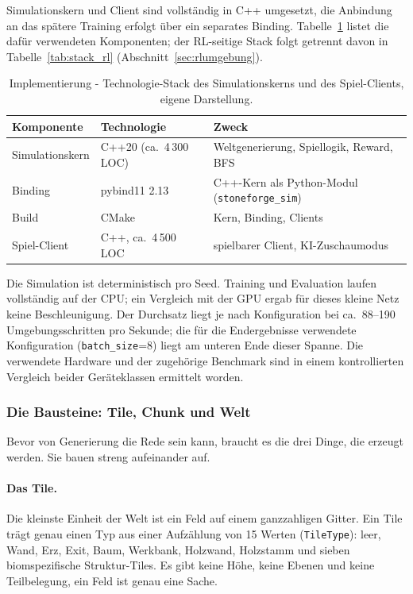 \documentclass[11pt,a4paper]{article}
\begin{document}
Simulationskern und Client sind vollständig in C++ umgesetzt, die Anbindung
an das spätere Training erfolgt über ein separates Binding.
Tabelle~\ref{tab:stack} listet die dafür verwendeten Komponenten; der
RL-seitige Stack folgt getrennt davon in Tabelle~\ref{tab:stack_rl}
(Abschnitt~\ref{sec:rlumgebung}).

\begin{table}[h]
\centering
\footnotesize
\begin{tabular}{@{}lll@{}}
\toprule
\textbf{Komponente} & \textbf{Technologie} & \textbf{Zweck} \\
\midrule
Simulationskern & C++20 (ca.\ 4\,300 LOC) & Weltgenerierung, Spiellogik, Reward, BFS \\
Binding & pybind11 2.13 & C++-Kern als Python-Modul (\texttt{stoneforge\_sim}) \\
Build & CMake & Kern, Binding, Clients \\
Spiel-Client & C++, ca.\ 4\,500 LOC & spielbarer Client, KI-Zuschaumodus \\
\bottomrule
\end{tabular}
\caption[Technologie-Stack: Spiel und Simulation]{Implementierung -
Technologie-Stack des Simulationskerns und des Spiel-Clients, eigene
Darstellung.}
\label{tab:stack}
\end{table}

Die Simulation ist deterministisch pro Seed. Training und Evaluation laufen
vollständig auf der CPU; ein Vergleich mit der GPU ergab für dieses kleine Netz
keine Beschleunigung. Der Durchsatz liegt je nach Konfiguration bei ca.\
88--190 Umgebungsschritten pro Sekunde; die für die Endergebnisse verwendete
Konfiguration (\texttt{batch\_size}=8) liegt am unteren Ende dieser Spanne. Die
verwendete Hardware und der zugehörige Benchmark sind in einem kontrollierten
Vergleich beider Geräteklassen ermittelt worden.

\subsubsection{Die Bausteine: Tile, Chunk und Welt}
\label{sec:bausteine}

Bevor von Generierung die Rede sein kann, braucht es die drei Dinge, die
erzeugt werden. Sie bauen streng aufeinander auf.

\paragraph{Das Tile.} Die kleinste Einheit der Welt ist ein Feld auf einem
ganzzahligen Gitter. Ein Tile trägt genau einen Typ aus einer Aufzählung von
15 Werten (\texttt{TileType}): leer, Wand, Erz, Exit,
Baum, Werkbank, Holzwand, Holzstamm und sieben biomspezifische
Struktur-Tiles. Es gibt keine Höhe, keine Ebenen und keine Teilbelegung, ein
Feld ist genau eine Sache.
\end{document}
